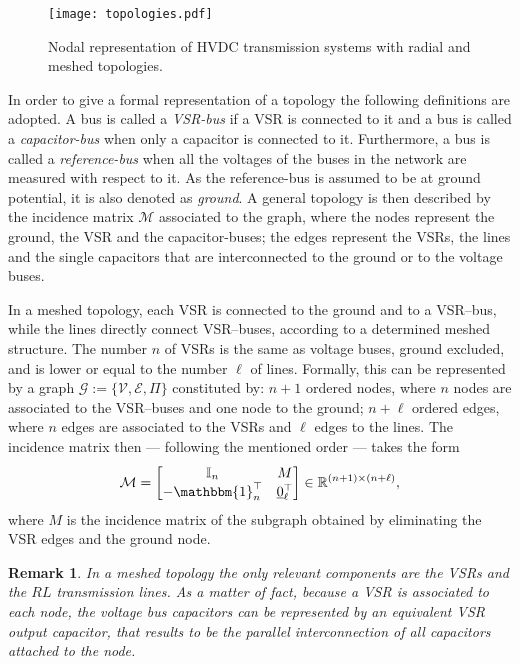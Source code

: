\documentclass[5p,twocolumn]{elsarticle}
\newtheorem{remark}[theorem]{Remark}
\numberwithin{equation}{section}
\begin{document}
\begin{figure}[ht]
 \centering
 \texttt{[image: topologies.pdf]}
 \caption{Nodal representation of HVDC transmission systems with radial and meshed topologies.}
 \label{topo}
\end{figure}

In order to give a formal representation of a topology the following definitions are adopted. A bus is called a \textit{VSR-bus} if a VSR is connected to it and a bus is called a
\textit{capacitor-bus} when only a capacitor is connected to it. Furthermore, a bus is called a \textit{reference-bus} when all the voltages of the buses in the network are measured with
respect to it. As the {reference-bus} is assumed to be at ground potential, it is also denoted as \textit{ground}. A general topology is then described by the incidence matrix $
\mathcal M$ associated
to the graph, where the nodes represent the {ground}, the {VSR} and the {capacitor-buses}; the edges represent the VSRs, the lines and the single capacitors that are interconnected to the
{ground} or to the voltage buses.

In a {meshed} topology, each VSR is connected to the {ground} and to a {VSR--bus}, while the lines directly connect {VSR--buses}, according to a determined meshed structure. The
number $n$ of VSRs is the same as voltage buses, {ground} excluded, and is lower or equal to the number $\ell$ of lines. Formally, this can be represented by a graph $\mathcal
G:=\{\mathcal{V},\mathcal{E},\Pi\}$ constituted by: $n+1$ ordered nodes, where $n$ nodes are associated to the {VSR--buses} and one node to the {ground}; $n+\ell$ ordered edges, where $n$
edges are associated to the VSRs and $\ell$ edges to the lines. The incidence matrix then --- following the mentioned order --- takes the form
\begin{equation}
\label{mdelta}
\mathcal M=\begin{bmatrix}
\mathbb{I}_n&M \\
-\mathbbm{1}^\top_{n}&\underline{0}^\top_\ell\\
\end{bmatrix}\in\mathbb{R}^{(n+1)\times (n+\ell)},
\end{equation}
where $M$ is the incidence matrix of the subgraph obtained by eliminating the VSR edges and the ground node.
\begin{remark}\em
\label{parallel}
In a {meshed} topology the only relevant components are the VSRs and the $RL$ transmission lines. As a matter of fact, because a VSR is associated to each node, the voltage bus capacitors
can be represented by an equivalent VSR output capacitor, that results to be the parallel interconnection of all capacitors attached to the node.
\end{remark}
\end{document}
